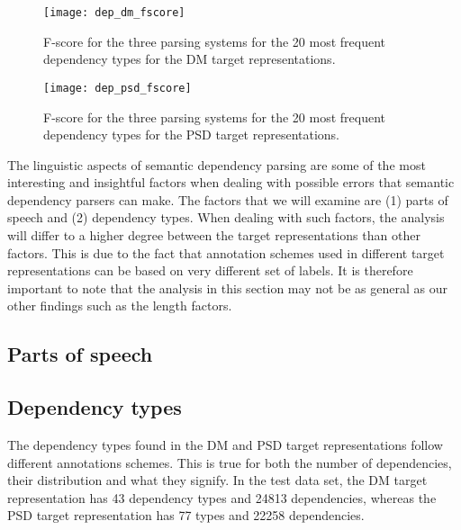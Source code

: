 \begin{figure}[h]
    \centering
    \begin{minipage}{0.8\textwidth}
        \centering
        \texttt{[image: dep\_dm\_fscore]}
    \end{minipage}\hfill
    \caption{F-score for the three parsing systems for the 20 most frequent dependency types for the DM target representations.}
    \label{fig:dep_fscore_1}
\end{figure}

\begin{figure}[h]
    \centering
    \begin{minipage}{0.8\textwidth}
        \centering
        \texttt{[image: dep\_psd\_fscore]}
    \end{minipage}
    \caption{F-score for the three parsing systems for the 20 most frequent dependency types for the PSD target representations.}
    \label{fig:dep_fscore_2}
\end{figure}

The linguistic aspects of semantic dependency parsing are some of the most interesting and insightful factors when dealing with possible errors that semantic dependency parsers can make. The factors that we will examine are (1) parts of speech and (2) dependency types. When dealing with such factors, the analysis will differ to a higher degree between the target representations than other factors. This is due to the fact that annotation schemes used in different target representations can be based on very different set of labels. It is therefore important to note that the analysis in this section may not be as general as our other findings such as the length factors.

\subsection{Parts of speech}

\subsection{Dependency types}

The dependency types found in the DM and PSD target representations follow different annotations schemes. This is true for both the number of dependencies, their distribution and what they signify. In the test data set, the DM target representation has 43 dependency types and 24813 dependencies, whereas the PSD target representation has 77 types and 22258 dependencies.

